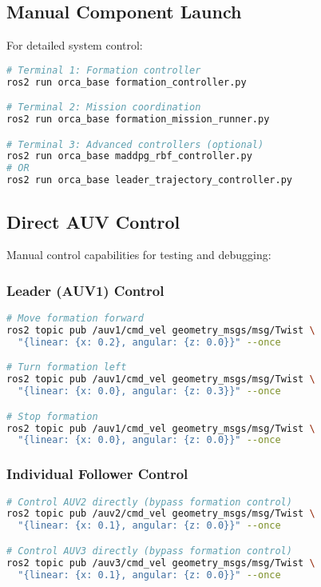 \documentclass[11pt,a4paper]{article}
\begin{document}
\subsection{Manual Component Launch}

For detailed system control:

\begin{lstlisting}[language=bash, caption=Manual Component Initialization]
# Terminal 1: Formation controller
ros2 run orca_base formation_controller.py

# Terminal 2: Mission coordination
ros2 run orca_base formation_mission_runner.py

# Terminal 3: Advanced controllers (optional)
ros2 run orca_base maddpg_rbf_controller.py
# OR
ros2 run orca_base leader_trajectory_controller.py
\end{lstlisting}

\subsection{Direct AUV Control}

Manual control capabilities for testing and debugging:

\subsubsection{Leader (AUV1) Control}

\begin{lstlisting}[language=bash, caption=Leader Control Commands]
# Move formation forward
ros2 topic pub /auv1/cmd_vel geometry_msgs/msg/Twist \
  "{linear: {x: 0.2}, angular: {z: 0.0}}" --once

# Turn formation left
ros2 topic pub /auv1/cmd_vel geometry_msgs/msg/Twist \
  "{linear: {x: 0.0}, angular: {z: 0.3}}" --once

# Stop formation
ros2 topic pub /auv1/cmd_vel geometry_msgs/msg/Twist \
  "{linear: {x: 0.0}, angular: {z: 0.0}}" --once
\end{lstlisting}

\subsubsection{Individual Follower Control}

\begin{lstlisting}[language=bash, caption=Follower Direct Control]
# Control AUV2 directly (bypass formation control)
ros2 topic pub /auv2/cmd_vel geometry_msgs/msg/Twist \
  "{linear: {x: 0.1}, angular: {z: 0.0}}" --once

# Control AUV3 directly (bypass formation control)
ros2 topic pub /auv3/cmd_vel geometry_msgs/msg/Twist \
  "{linear: {x: 0.1}, angular: {z: 0.0}}" --once
\end{lstlisting}
\end{document}
